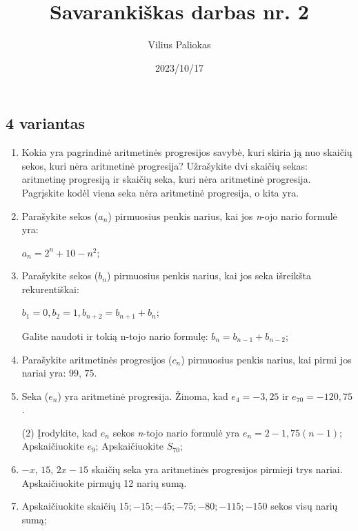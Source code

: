 \documentclass[a4paper]{article}
\title{Savarankiškas darbas nr. 2}
\author{Vilius Paliokas}
\date{2023/10/17}
\begin{document}
\thispagestyle{fancy}

\subsection*{4 variantas}

\begin{enumerate}
      \item Kokia yra pagrindinė aritmetinės progresijos savybė, kuri skiria ją
            nuo skaičių sekos, kuri nėra aritmetinė progresija? Užrašykite dvi
            skaičių sekas: aritmetinę progresiją ir skaičių seka, kuri nėra
            aritmetinė progresija. Pagrįskite kodėl viena seka nėra
            aritmetinė progresija, o kita yra.

      \item Parašykite sekos ($a_{n}$) pirmuosius penkis
            narius, kai jos \textit{n}-ojo nario formulė yra:

            $a_{n}=2^n+10-n^2$;

      \item Parašykite sekos ($b_{n}$) pirmuosius penkis
            narius, kai jos seka išreikšta rekurentiškai:

            $b_1 = 0, b_2 = 1, b_{n+2}=b_{n+1}+b_{n}$;

            Galite naudoti ir tokią n-tojo nario formulę: 
            $b_{n}=b_{n-1}+b_{n-2}$;

      \item Parašykite aritmetinės progresijos ($c_{n}$) pirmuosius penkis
            narius, kai pirmi jos nariai yra: $99$, $75$.

      \item Seka ($e_{n}$) yra aritmetinė progresija. Žinoma, kad $e_{4}=-3,25$ ir
            $e_{70}=-120,75$.

            \begin{tasks}[item-format={\normalfont}, after-item-skip=2mm](2)
                  \task* Įrodykite, kad $e_{n}$ sekos \textit{n}-tojo nario
                  formulė yra $e_{n}=2-1,75(n-1)$;
                  \task Apskaičiuokite $e_{9}$;
                  \task Apskaičiuokite $S_{70}$;
            \end{tasks}

      \item $ -x $, $ 15 $, $ 2x - 15$ skaičių seka yra aritmetinės progresijos
            pirmieji trys nariai. Apskaičiuokite pirmųjų 12 narių sumą.

      \item Apskaičiuokite skaičių $ 15;-15;-45;-75;-80;-115;-150$ sekos visų narių sumą;


\end{enumerate}
\end{document}
